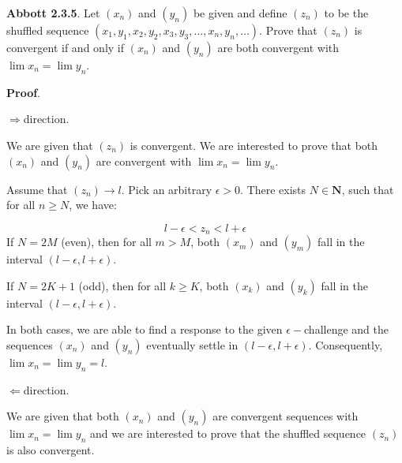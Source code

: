 \documentclass[10pt]{article}
\begin{document}
\textbf{Abbott 2.3.5}. Let $\displaystyle ( x_{n})$ and $\displaystyle ( y_{n})$ be given and define $\displaystyle ( z_{n})$ to be the shuffled sequence $\displaystyle ( x_{1} ,y_{1} ,x_{2} ,y_{2} ,x_{3} ,y_{3} ,\dotsc ,x_{n} ,y_{n} ,\dotsc )$. Prove that $\displaystyle ( z_{n})$ is convergent if and only if $\displaystyle ( x_{n})$ and $\displaystyle ( y_{n})$ are both convergent with $\displaystyle \lim x_{n} =\lim y_{n}$.



\textbf{Proof}.



$\displaystyle \Longrightarrow $direction.



We are given that $\displaystyle ( z_{n})$ is convergent. We are interested to prove that both $\displaystyle ( x_{n})$ and $\displaystyle ( y_{n})$ are convergent with $\displaystyle \lim x_{n} =\lim y_{n}$.



Assume that $\displaystyle ( z_{n})\rightarrow l$. Pick an arbitrary $\displaystyle \epsilon  >0$. There exists $\displaystyle N\in \mathbf{N}$, such that for all $\displaystyle n\geq N$, we have:


\begin{equation*}
l-\epsilon < z_{n} < l+\epsilon 
\end{equation*}
If $\displaystyle N=2M$ (even), then for all $\displaystyle m >M$, both $\displaystyle ( x_{m})$ and $\displaystyle ( y_{m})$ fall in the interval $\displaystyle ( l-\epsilon ,l+\epsilon )$.



If $\displaystyle N=2K+1$ (odd), then for all $\displaystyle k\geq K$, both $\displaystyle ( x_{k})$ and $\displaystyle ( y_{k})$ fall in the interval $\displaystyle ( l-\epsilon ,l+\epsilon )$. 



In both cases, we are able to find a response to the given $\displaystyle \epsilon -$challenge and the sequences $\displaystyle ( x_{n})$ and $\displaystyle ( y_{n})$ eventually settle in $\displaystyle ( l-\epsilon ,l+\epsilon )$. Consequently, $\displaystyle \lim x_{n} =\lim y_{n} =l$.



$\displaystyle \Longleftarrow $direction.



We are given that both $\displaystyle ( x_{n})$ and $\displaystyle ( y_{n})$ are convergent sequences with $\displaystyle \lim x_{n} =\lim y_{n}$ and we are interested to prove that the shuffled sequence $\displaystyle ( z_{n})$ is also convergent.
\end{document}
